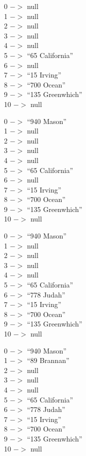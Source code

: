 \documentclass[10pt]{article}
\begin{document}
\begin{enumerate}
			\vspace{0.5cm}
			0 $->$ null\\
			1 $->$ null\\
			2 $->$ null\\
			3 $->$ null\\
			4 $->$ null\\
			5 $->$ ``65 California''\\
			6 $->$ null\\
			7 $->$ ``15 Irving''\\
			8 $->$ ``700 Ocean''\\
			9 $->$ ``135 Greenwhich''\\
			10 $->$ null
			
			\vspace{0.5cm}
			0 $->$ ``940 Mason''\\
			1 $->$ null\\
			2 $->$ null\\
			3 $->$ null\\
			4 $->$ null\\
			5 $->$ ``65 California''\\
			6 $->$ null\\
			7 $->$ ``15 Irving''\\
			8 $->$ ``700 Ocean''\\
			9 $->$ ``135 Greenwhich''\\
			10 $->$ null
			
			\vspace{0.5cm}
			0 $->$ ``940 Mason''\\
			1 $->$ null\\
			2 $->$ null\\
			3 $->$ null\\
			4 $->$ null\\
			5 $->$ ``65 California''\\
			6 $->$ ``778 Judah''\\
			7 $->$ ``15 Irving''\\
			8 $->$ ``700 Ocean''\\
			9 $->$ ``135 Greenwhich''\\
			10 $->$ null
			
			\vspace{0.5cm}
			0 $->$ ``940 Mason''\\
			1 $->$ ``89 Brannan''\\
			2 $->$ null\\
			3 $->$ null\\
			4 $->$ null\\
			5 $->$ ``65 California''\\
			6 $->$ ``778 Judah''\\
			7 $->$ ``15 Irving''\\
			8 $->$ ``700 Ocean''\\
			9 $->$ ``135 Greenwhich''\\
			10 $->$ null
		

\end{enumerate}
\end{document}
